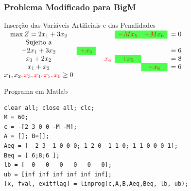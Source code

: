 \documentclass{beamer}
\begin{document}
\begin{frame}[fragile]
	\frametitle{Problema Modificado para BigM}
		\begin{alertblock}{\centering Inserção das Variáveis Artificiais e das Penalidades}
			\centering
			$
				\begin{matrix}
					\max Z = 2x_1+3x_2  &                                       &                   & \cellcolor{green!70}{\color{red}-Mx_5} & \cellcolor{green!70}{\color{red}- Mx_6}  & =0 \\
					\text{Sujeito a} \\
					-2x_1+3x_2          & \cellcolor{green!70}{\color{red}+x_3} &                   &                                        &                                          & =6 \\
					x_1 + 2x_2          &                                       & {\color{red}-x_4} & \cellcolor{green!70}{\color{red}+x_5}  &                                          & =8 \\
					x_1 + x_2           &                                       &                   &                                        & \cellcolor{green!70}{\color{red}+x_6}    & =6 \\
					x_1, x_2{\color{red},x_3,x_4,x_5,x_6} \ge 0 \\
				\end{matrix}
			$
		\end{alertblock}
			\begin{block}{Programa em Matlab}
				\begin{lstlisting}[basicstyle=\tiny]  
clear all; close all; clc;
M = 60;
c = -[2 3 0 0 -M -M];
A = []; B=[];
Aeq = [ -2 3  1 0 0 0; 1 2 0 -1 1 0; 1 1 0 0 0 1];
Beq = [ 6;8;6 ];
lb = [  0   0   0   0   0   0];
ub = [inf inf inf inf inf inf];
[x, fval, exitflag] = linprog(c,A,B,Aeq,Beq, lb, ub);
				\end{lstlisting}			
			\end{block}
\end{frame}
\end{document}
